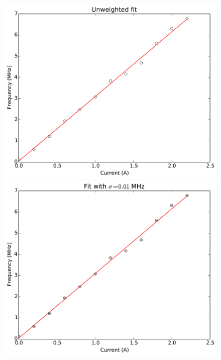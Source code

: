 \documentclass[11pt,letterpaper]{article}
\begin{document}
\begin{figure}
    \centering
    \begin{minipage}[t]{0.45\textwidth}
        \centering
        \includegraphics[width=\textwidth]{figures/problem5_1.pdf}
    \end{minipage}
    \hspace{0.5cm}
    \begin{minipage}[t]{0.45\textwidth}
        \centering
        \includegraphics[width=\textwidth]{figures/problem5_2.pdf}
    \end{minipage}

\end{figure}
\end{document}
